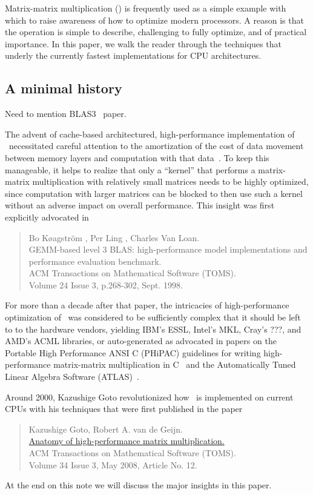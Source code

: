 Matrix-matrix multiplication (\Gemm) is frequently used as a simple example with which to raise awareness of how to optimize modern processors.  A reason is that the operation is simple to describe, challenging to fully optimize, and of practical importance.  In this paper, we walk the reader through the techniques that underly the currently fastest implementations for CPU architectures.

\subsection{A minimal history}

Need to mention BLAS3~\cite{BLAS3} paper.

The advent of cache-based architectured, high-performance implementation of \Gemm\ necessitated careful attention to 
the amortization of the cost of data movement between memory layers and computation with that data~\cite{}.
To keep this manageable, it helps to realize that only a ``kernel'' that performs a  matrix-matrix multiplication with relatively small matrices needs to be highly optimized, since
computation with larger matrices can be blocked to then use such a kernel without an adverse impact on overall performance.  This 
insight was first explicitly advocated in
\begin{quote}
	Bo K\o{a}gstr\"{o}m , Per Ling , Charles Van Loan.\\
	 GEMM-based level 3 BLAS: high-performance model implementations and performance evaluation benchmark. \\
	  ACM Transactions on Mathematical Software (TOMS). \\
	  Volume 24 Issue 3, p.268-302, Sept. 1998.
\end{quote}

For more than a decade after that paper, the intricacies of 
high-performance optimization of \Gemm\ was considered to be 
sufficiently complex that it should be left to to the hardware vendors, yielding IBM's ESSL, Intel's MKL, Cray's ???, and AMD's ACML libraries, or auto-generated as advocated in papers on 
the Portable High Performance ANSI C (PHiPAC) guidelines for writing high-performance matrix-matrix multiplication in C~\cite{} and the Automatically Tuned Linear Algebra Software (ATLAS)~\cite{}.

Around 2000, Kazushige Goto revolutionized how \Gemm\ is implemented on current CPUs with his techniques
that were first published in the paper
\begin{quote}
	Kazushige Goto, Robert A. van de Geijn.\\
	\href{http://dl.acm.org/citation.cfm?id=1356052.1356053&coll=DL&dl=GUIDE&CFID=71223967&CFTOKEN=96440140}{Anatomy of high-performance matrix multiplication.}\\
	ACM Transactions on Mathematical Software (TOMS).\\
	Volume 34 Issue 3, May 2008, Article No. 12.
\end{quote}
At the end on this note we will discuss the major insights in this
paper.



